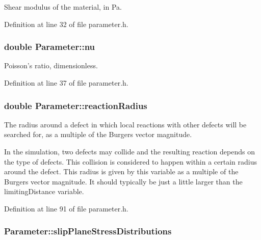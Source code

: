\-Shear modulus of the material, in \-Pa. 



\-Definition at line 32 of file parameter.\-h.

\hypertarget{classParameter_ad1e17a52ea8a3481afc657cafb721d4e}{
\subsubsection[{nu}]{\setlength{\rightskip}{0pt plus 5cm}double {\bf \-Parameter\-::nu}}}\label{dc/dab/classParameter_ad1e17a52ea8a3481afc657cafb721d4e}


\-Poisson's ratio, dimensionless. 



\-Definition at line 37 of file parameter.\-h.

\hypertarget{classParameter_ac1e7cdb4673a7578b783fb0a71bb5722}{
\subsubsection[{reaction\-Radius}]{\setlength{\rightskip}{0pt plus 5cm}double {\bf \-Parameter\-::reaction\-Radius}}}\label{dc/dab/classParameter_ac1e7cdb4673a7578b783fb0a71bb5722}


\-The radius around a defect in which local reactions with other defects will be searched for, as a multiple of the \-Burgers vector magnitude. 

\-In the simulation, two defects may collide and the resulting reaction depends on the type of defects. \-This collision is considered to happen within a certain radius around the defect. \-This radius is given by this variable as a multiple of the \-Burgers vector magnitude. \-It should typically be just a little larger than the limiting\-Distance variable. 

\-Definition at line 91 of file parameter.\-h.

\hypertarget{classParameter_ad044e621f170fac3b3f743db5a19f817}{
\subsubsection[{slip\-Plane\-Stress\-Distributions}]{ {\bf \-Parameter\-::slip\-Plane\-Stress\-Distributions}}}\label{dc/dab/classParameter_ad044e621f170fac3b3f743db5a19f817}


